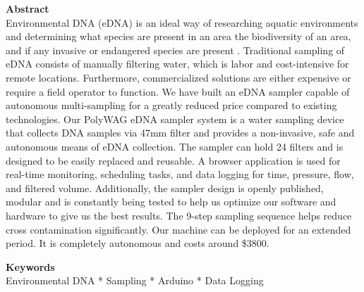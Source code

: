 \documentclass[11pt, letterpaper]{article}
\begin{document}
\begin{flushleft}
%
%
\textbf{Abstract} \\ 
Environmental DNA (eDNA) is an ideal way of researching aquatic environments and determining what species are present in an area the biodiversity of an area, and if any invasive or endangered species are present . Traditional sampling of eDNA consists of manually filtering water,  which is labor and cost-intensive for remote locations. Furthermore, commercialized solutions  are either expensive or require a field operator to function.  We have built an eDNA sampler capable of autonomous multi-sampling for a greatly reduced price compared to existing technologies. Our PolyWAG eDNA sampler system is a water sampling device that collects DNA samples via 47mm filter and provides a non-invasive, safe and autonomous means of eDNA collection. The sampler can hold 24 filters and is designed to be easily replaced and reusable. A browser application is used for real-time monitoring, scheduling tasks, and data logging for time, pressure, flow, and filtered volume. Additionally, the sampler design is openly published, modular and is constantly being tested to help us optimize our software and hardware to give us the best results. The 9-step  sampling sequence helps reduce cross contamination significantly. Our machine can be deployed for an extended period. It is completely autonomous and costs around \$3800.


%
%
\textbf{Keywords} \\
Environmental DNA * Sampling * Arduino * Data Logging \\



\end{flushleft}
\end{document}

